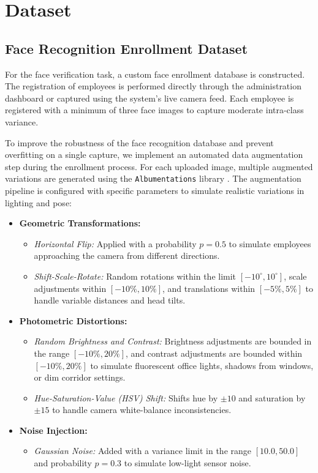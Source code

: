 \chapter{Dataset}

\section{Face Recognition Enrollment Dataset}
For the face verification task, a custom face enrollment database is constructed. The registration of employees is performed directly through the administration dashboard or captured using the system's live camera feed. Each employee is registered with a minimum of three face images to capture moderate intra-class variance. 

To improve the robustness of the face recognition database and prevent overfitting on a single capture, we implement an automated data augmentation step during the enrollment process. For each uploaded image, multiple augmented variations are generated using the \texttt{Albumentations} library \cite{albumentations}. The augmentation pipeline is configured with specific parameters to simulate realistic variations in lighting and pose:
\begin{itemize}
    \item \textbf{Geometric Transformations:} 
    \begin{itemize}
        \item \textit{Horizontal Flip:} Applied with a probability $p = 0.5$ to simulate employees approaching the camera from different directions.
        \item \textit{Shift-Scale-Rotate:} Random rotations within the limit $[-10^\circ, 10^\circ]$, scale adjustments within $[-10\%, 10\%]$, and translations within $[-5\%, 5\%]$ to handle variable distances and head tilts.
    \end{itemize}
    \item \textbf{Photometric Distortions:} 
    \begin{itemize}
        \item \textit{Random Brightness and Contrast:} Brightness adjustments are bounded in the range $[-10\%, 20\%]$, and contrast adjustments are bounded within $[-10\%, 20\%]$ to simulate fluorescent office lights, shadows from windows, or dim corridor settings.
        \item \textit{Hue-Saturation-Value (HSV) Shift:} Shifts hue by $\pm 10$ and saturation by $\pm 15$ to handle camera white-balance inconsistencies.
    \end{itemize}
    \item \textbf{Noise Injection:} 
    \begin{itemize}
        \item \textit{Gaussian Noise:} Added with a variance limit in the range $[10.0, 50.0]$ and probability $p = 0.3$ to simulate low-light sensor noise.
    \end{itemize}
\end{itemize}
